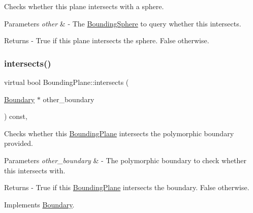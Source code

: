 Checks whether this plane intersects with a sphere. 
\begin{DoxyParams}{Parameters}
{\em other} & -\/ The \mbox{\hyperlink{class_bounding_sphere}{Bounding\+Sphere}} to query whether this intersects. \\
\hline
\end{DoxyParams}
\begin{DoxyReturn}{Returns}
-\/ True if this plane intersects the sphere. False otherwise. 
\end{DoxyReturn}
\mbox{\label{class_bounding_plane_a3d956121121f32384cab3cab34544d6e}} 
\subsubsection{\texorpdfstring{intersects()}{intersects()}\hspace{0.1cm}{\footnotesize\ttfamily [2/2]}}
{\footnotesize\ttfamily virtual bool Bounding\+Plane\+::intersects (\begin{DoxyParamCaption}\item[{\mbox{\hyperlink{class_boundary}{Boundary}} $\ast$}]{other\+\_\+boundary }\end{DoxyParamCaption}) const\hspace{0.3cm}{\ttfamily [override]}, {\ttfamily [virtual]}}

Checks whether this \mbox{\hyperlink{class_bounding_plane}{Bounding\+Plane}} intersects the polymorphic boundary provided. 
\begin{DoxyParams}{Parameters}
{\em other\+\_\+boundary} & -\/ The polymorphic boundary to check whether this intersects with. \\
\hline
\end{DoxyParams}
\begin{DoxyReturn}{Returns}
-\/ True if this \mbox{\hyperlink{class_bounding_plane}{Bounding\+Plane}} intersects the boundary. False otherwise. 
\end{DoxyReturn}


Implements \mbox{\hyperlink{class_boundary_a364909bdfa4a4945f974c34a39e198cc}{Boundary}}.

\mbox{\label{class_bounding_plane_aa271e305ed07117a8c82eedf1fd0f037}} 

